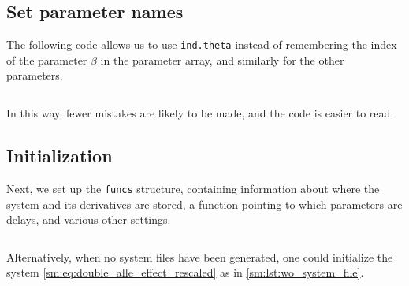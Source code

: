 \subsection{Set parameter names}
The following code allows us to use
\texttt{ind.theta} instead of remembering the
index of the parameter $\beta$ in the parameter array, and similarly for the
other parameters.
\inputminted[firstline=27, lastline=30]{MATLAB}{\pathToDDEBifToolDemos/predator_prey/predator_prey.m}
In this way, fewer mistakes are likely to be made, and the code is easier to read.

\subsection{Initialization}
Next, we set up the \texttt{funcs} structure, containing information about
where the system and its derivatives are stored, a function pointing to which
parameters are delays, and various other settings.
\inputminted[firstline=32, lastline=35]{MATLAB}{\pathToDDEBifToolDemos/predator_prey/predator_prey.m}
Alternatively, when no system files have been generated, one could initialize
the system \cref{sm:eq:double_alle_effect_rescaled} as in \cref{sm:lst:wo_system_file}.

